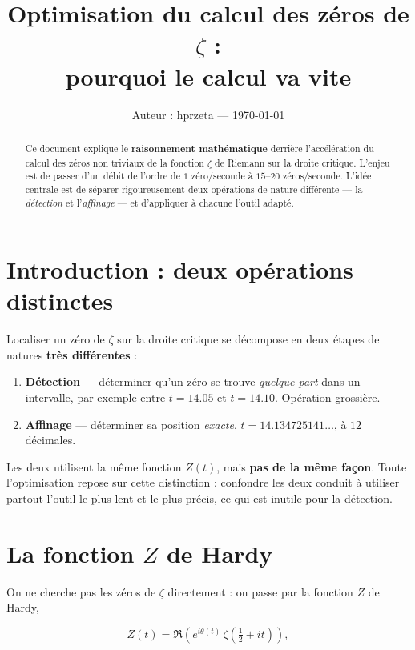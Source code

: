 \documentclass[11pt,a4paper]{article}
\title{\textbf{Optimisation du calcul des zéros de $\zeta$ :\\ pourquoi le calcul va vite}}
\date{\small Auteur : hprzeta --- \today}
\begin{document}
\maketitle

\begin{abstract}
\noindent
Ce document explique le \textbf{raisonnement mathématique} derrière l'accélération du
calcul des zéros non triviaux de la fonction $\zeta$ de Riemann sur la droite critique.
L'enjeu est de passer d'un débit de l'ordre de $1$ zéro/seconde à $15$--$20$ zéros/seconde.
L'idée centrale est de séparer rigoureusement deux opérations de nature différente ---
la \emph{détection} et l'\emph{affinage} --- et d'appliquer à chacune l'outil adapté.
\end{abstract}

\section{Introduction : deux opérations distinctes}

Localiser un zéro de $\zeta$ sur la droite critique se décompose en deux étapes
de natures \textbf{très différentes} :

\begin{enumerate}
\item \textbf{Détection} --- déterminer qu'un zéro se trouve \emph{quelque part} dans un
intervalle, par exemple entre $t = 14.05$ et $t = 14.10$. Opération grossière.
\item \textbf{Affinage} --- déterminer sa position \emph{exacte},
$t = 14.134725141\ldots$, à $12$ décimales.
\end{enumerate}

Les deux utilisent la même fonction $Z(t)$, mais \textbf{pas de la même façon}.
Toute l'optimisation repose sur cette distinction : confondre les deux conduit à utiliser
partout l'outil le plus lent et le plus précis, ce qui est inutile pour la détection.

\section{La fonction $Z$ de Hardy}

On ne cherche pas les zéros de $\zeta$ directement : on passe par la fonction $Z$ de Hardy,

\[
Z(t) = \Re\left(e^{i\theta(t)}\,\zeta\left(\tfrac{1}{2}+it\right)\right),
\]
\end{document}
